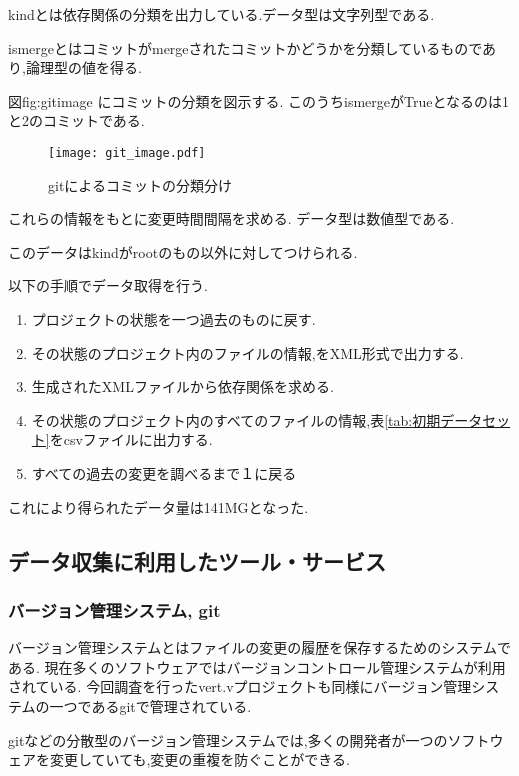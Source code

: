 \documentclass[submit,ses,noauthor]{ipsj} %
\begin{document}
kindとは依存関係の分類を出力している.データ型は文字列型である.

ismergeとはコミットがmergeされたコミットかどうかを分類しているものであり,論理型の値を得る.

図{fig:gitimage} にコミットの分類を図示する.
このうちismergeがTrueとなるのは1と2のコミットである.

\begin{figure*}[t]
\centering
\texttt{[image: git\_image.pdf]}
\caption{gitによるコミットの分類分け}
\label{fig:gitimage} 
\end{figure*}


これらの情報をもとに変更時間間隔を求める.
データ型は数値型である.


このデータはkindがrootのもの以外に対してつけられる.

以下の手順でデータ取得を行う.
\begin{enumerate}
\item プロジェクトの状態を一つ過去のものに戻す.
\item その状態のプロジェクト内のファイルの情報,をXML形式で出力する.
\item 生成されたXMLファイルから依存関係を求める.
\item その状態のプロジェクト内のすべてのファイルの情報,表\ref{tab:初期データセット}をcsvファイルに出力する.
\item すべての過去の変更を調べるまで１に戻る
\end{enumerate}
これにより得られたデータ量は141MGとなった.

\subsection{データ収集に利用したツール・サービス}
\subsubsection{バージョン管理システム, git}
バージョン管理システムとはファイルの変更の履歴を保存するためのシステムである.
現在多くのソフトウェアではバージョンコントロール管理システムが利用されている.
今回調査を行ったvert.vプロジェクトも同様にバージョン管理システムの一つであるgitで管理されている.

gitなどの分散型のバージョン管理システムでは,多くの開発者が一つのソフトウェアを変更していても,変更の重複を防ぐことができる.
\end{document}
